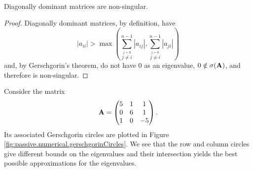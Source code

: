 \begin{corr}\label{corr:passive.numerical.diagDominantMatrices}
 Diagonally dominant matrices are non-singular.
\end{corr}

 \begin{proof}
  Diagonally dominant matrices, by definition, have 
    \begin{equation}
     |a_{ii}| > \max\left(\sum_{\stackrel{j=0}{j\neq i}}^{n-1} |a_{ij}|, \sum_{\stackrel{j=0}{j\neq i}}^{n-1} |a_{ji}|\right)
    \end{equation}
  and, by Gerschgorin's theorem, do not have 0 as an eigenvalue, $0\notin\sigma(\mathbf{A})$, and therefore is 
  non-singular.
 \end{proof}

\begin{exmp}
  Consider the matrix \cite[p.~499]{MEY2001}
  \begin{equation}
    \label{eq:passive.numerical.exampleMatrixGerschgorin}
    \mathbf{A} = \begin{pmatrix} 5 & 1 & 1 \\ 0 & 6 & 1 \\ 1 & 0 & -5 \end{pmatrix}.
  \end{equation}
  Its associated Gerschgorin circles are plotted in Figure \ref{fig:passive.numerical.gerschgorinCircles}. 
  We see that the row and column circles give different bounds on the eigenvalues and their intersection 
  yields the best possible approximations for the eigenvalues. 
\end{exmp}

